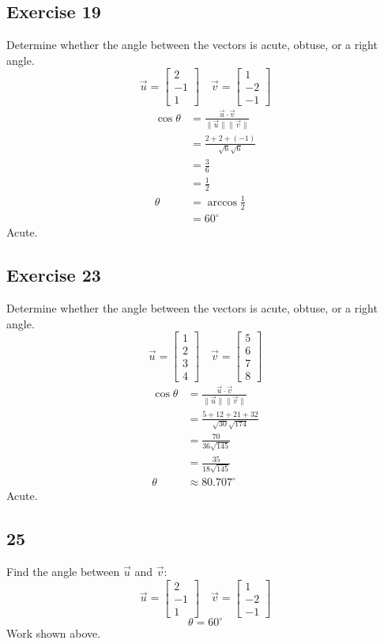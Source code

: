 \documentclass{math}
\begin{document}
\subsection*{Exercise 19}
Determine whether the angle between the vectors is acute, obtuse, or a right
angle.
\[ \vec{u} = \begin{bmatrix}2 \\ -1 \\ 1\end{bmatrix} \quad
  \vec{v} = \begin{bmatrix}1 \\ -2 \\ -1\end{bmatrix} \]
\begin{align*}
  \cos\theta &= \frac{\vec{u}\cdot\vec{v}}{\|\vec{u}\|\|\vec{v}\|} \\
  &= \frac{2+2+(-1)}{\sqrt{6}\sqrt{6}} \\
  &= \frac{3}{6} \\
  &= \frac{1}{2} \\
  \theta &= \arccos\frac{1}{2} \\
  &= 60^{\circ}
\end{align*}
Acute.

\subsection*{Exercise 23}
Determine whether the angle between the vectors is acute, obtuse, or a right
angle.
\[ \vec{u} = \begin{bmatrix}1 \\ 2 \\ 3 \\ 4\end{bmatrix} \quad
  \vec{v} = \begin{bmatrix}5 \\ 6 \\ 7 \\ 8\end{bmatrix} \]
\begin{align*}
  \cos\theta &= \frac{\vec{u}\cdot\vec{v}}{\|\vec{u}\|\|\vec{v}\|} \\
  &= \frac{5+12+21+32}{\sqrt{30}\sqrt{174}} \\
  &= \frac{70}{36\sqrt{145}} \\
  &= \frac{35}{18\sqrt{145}} \\
  \theta &\approx 80.707^{\circ}
\end{align*}
Acute.

\subsection*{25}
Find the angle between \( \vec{u} \) and \( \vec{v} \):
\[ \vec{u} = \begin{bmatrix}2 \\ -1 \\ 1\end{bmatrix} \quad
  \vec{v} = \begin{bmatrix}1 \\ -2 \\ -1\end{bmatrix} \]
\[ \theta = 60^{\circ} \]
Work shown above.
\end{document}
